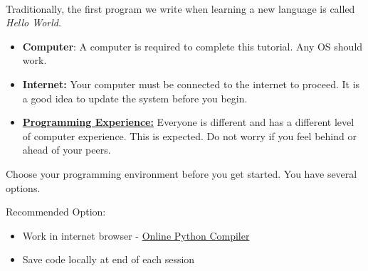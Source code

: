 \documentclass[12pt]{article}
\begin{document}
\begin{description}[labelindent=1cm]
	
	\item[\textbf{\underline{Overview:}}] \hfill \vspace{3mm}\\
	Traditionally, the first program we write when learning a new language is called {\it Hello World}.
	
	\item[\textbf{\underline{System Requirements:}}] \hfill \vspace{0mm}

\begin{itemize}
	\item {\bf Computer}: A computer is required to complete this tutorial. Any OS should work.
	\item {\bf Internet:} Your computer must be connected to the internet to proceed. It is a good idea to update the system before you begin. 
\end{itemize}

	\item[\textbf{\underline{Disclaimer:}}] \hfill \vspace{0mm}
	
	\begin{itemize}

		\item {\GR\underline{\bf Programming Experience:}} Everyone is different and has a different level of computer experience. This is expected. Do not worry if you feel behind or ahead of your peers.
		 
	\end{itemize}

\item[\textbf{\underline{Part 1 - Programming Environment:}}] \hfill \vspace{0mm}

Choose your programming environment before you get started. You have several options.

Recommended Option:

\begin{itemize}

	\item Work in internet browser - \href{https://www.online-python.com/online_python_compiler}{Online Python Compiler} 

	\item Save code locally at end of each session

\end{itemize}


\end{description}
\end{document}
